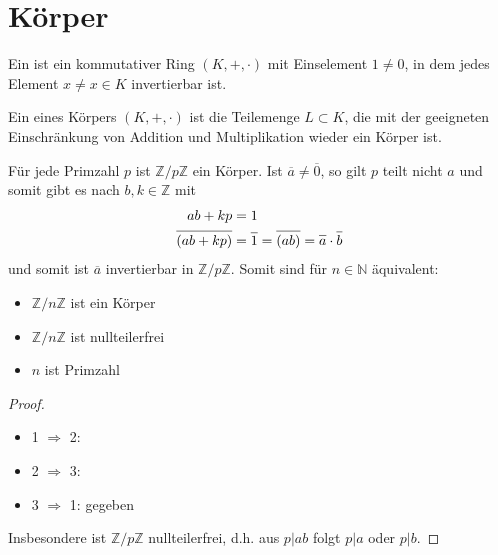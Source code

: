 \section{Körper}

\begin{definition}[Körper]
	Ein  ist ein kommutativer Ring $(K,+,\cdot)$ mit Einselement 
	$1 \neq 0$, in dem jedes Element $x \neq x \in K$ invertierbar ist.
\end{definition}

\begin{definition}[Teilkörper]
	Ein  eines Körpers $(K,+,\cdot)$ ist die Teilemenge $L 
	\subset K$, die mit der geeigneten Einschränkung von Addition und Multiplikation wieder ein
	Körper ist.
\end{definition}

\begin{example}
	Für jede Primzahl $p$ ist $\mathbb Z /p \mathbb Z$ ein Körper. Ist $\overline{a}\neq \overline{0}$, so gilt 
	$p$ teilt nicht $a$ und somit gibt es nach  $b,k \in \mathbb Z$ mit \\
	\begin{align}
		ab+kp &= 1 \notag \\
		\overline{(ab+kp)} &= \overline{1} = \overline{(ab)} = \overline{a} \cdot \overline{b} \notag
	\end{align}
	und somit ist $\overline{a}$ invertierbar in $\mathbb Z /p \mathbb Z$. Somit sind für $n \in \mathbb N$
	äquivalent:
	\begin{itemize}
		\item $\mathbb Z /n \mathbb Z$ ist ein Körper
		\item $\mathbb Z /n \mathbb Z$ ist nullteilerfrei
		\item $n$ ist Primzahl
	\end{itemize}
\end{example}
\begin{proof}
	\begin{itemize}
		\item 1 $\Rightarrow$ 2: 
		\item 2 $\Rightarrow$ 3: 
		\item 3 $\Rightarrow$ 1: gegeben
	\end{itemize}
	Insbesondere ist $\mathbb Z /p \mathbb Z$ nullteilerfrei, d.h. aus $p\vert ab$ folgt $p\vert a$ oder $p\vert b$.
\end{proof}